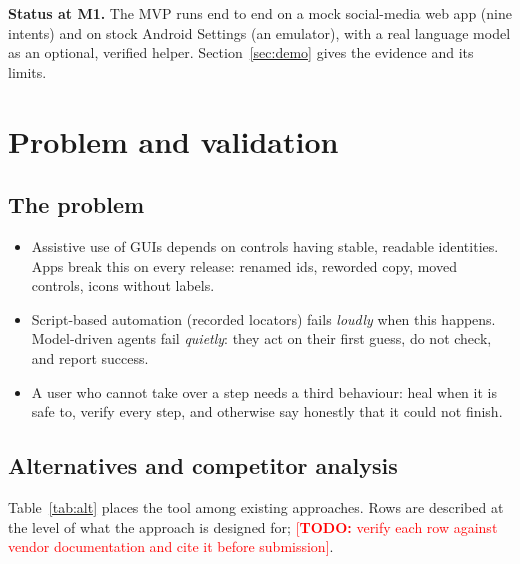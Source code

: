 \documentclass[11pt,a4paper]{article}
\newcommand{\todo}[1]{\textcolor{red}{[\textbf{TODO:} #1]}}
\begin{document}
\textbf{Status at M1.} The MVP runs end to end on a mock social-media web app (nine intents) and on stock Android Settings (an emulator), with a real language model as an optional, verified helper. Section~\ref{sec:demo} gives the evidence and its limits.

\section{Problem and validation}\label{sec:problem}
\subsection{The problem}
\begin{itemize}
\item Assistive use of GUIs depends on controls having stable, readable identities. Apps break this on every release: renamed ids, reworded copy, moved controls, icons without labels.
\item Script-based automation (recorded locators) fails \emph{loudly} when this happens. Model-driven agents fail \emph{quietly}: they act on their first guess, do not check, and report success.
\item A user who cannot take over a step needs a third behaviour: heal when it is safe to, verify every step, and otherwise say honestly that it could not finish.
\end{itemize}

\subsection{Alternatives and competitor analysis}
Table~\ref{tab:alt} places the tool among existing approaches. Rows are described at the level of what the approach is designed for; \todo{verify each row against vendor documentation and cite it before submission}.
\end{document}
